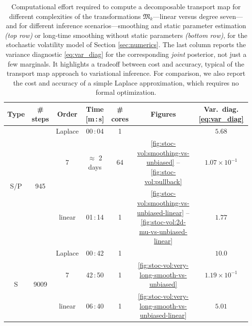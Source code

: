 \documentclass[twoside,11pt]{article}
\newcommand{\submap}{\mathfrak{M}}
\begin{document}
\begin{table}[H]
  \centering
  \begin{tabular}{c|c|c|c|c|c|c}
    \textbf{Type} & \textbf{\# steps} & \textbf{Order} & \textbf{Time [m\,:\,s]} & \textbf{\# cores} & \textbf{Figures} & \textbf{Var.\ diag.} \eqref{eq:var_diag}\\ \hline\hline
    \multirow{3}{*}{S/P} & \multirow{3}{*}{945} & Laplace & 00\,:\,04 & 1 & & $5.68$ \\
    & & 
    7
    & $\approx$ 2 days & 64 & 
    \ref{fig:stoc-vol:smoothing-vs-unbiased} --
    \ref{fig:stoc-vol:pullback} & $1.07 \times 10^{-1}$ \\
    & & linear & 01\,:\,14 & 1 & 
    \ref{fig:stoc-vol:smoothing-vs-unbiased-linear} --
    \ref{fig:stoc-vol:2d-mu-vs-unbiased-linear} & $1.77$ \\ \hline
    \multirow{3}{*}{S} & \multirow{3}{*}{9009} & Laplace & 00\,:\,42 & 1 & & $10.0$ \\
    & & %
    7
    & 42\,:\,50 & 1 & \ref{fig:stoc-vol:very-long-smooth-vs-unbiased} & $1.19 \times 10^{-1}$ \\
    & & linear & 06\,:\,40 & 1 & \ref{fig:stoc-vol:very-long-smooth-vs-unbiased-linear} & $5.01$ \\ \hline
  \end{tabular}
      \caption{Computational effort required to compute
      a decomposable transport map for different complexities of the
      transformations $\submap_k$---linear versus degree seven---and for
      different inference scenarios---smoothing and static
      parameter estimation {\it(top row)} or long-time smoothing
      without static parameters {\it(bottom row)}, for the stochastic
      volatility model of Section \ref{sec:numerics}. The last column
      reports the variance diagnostic 
      \eqref{eq:var_diag} for the corresponding \emph{joint} posterior, not just a
      few marginals. It highlights a tradeoff between cost and
      accuracy, typical of the transport map approach to variational
      inference. For comparison, we also report the cost and accuracy
      of a simple Laplace approximation, which requires no formal
      optimization.
      }

      \label{tab:cost_vs_accuracy}
\end{table}
\end{document}
